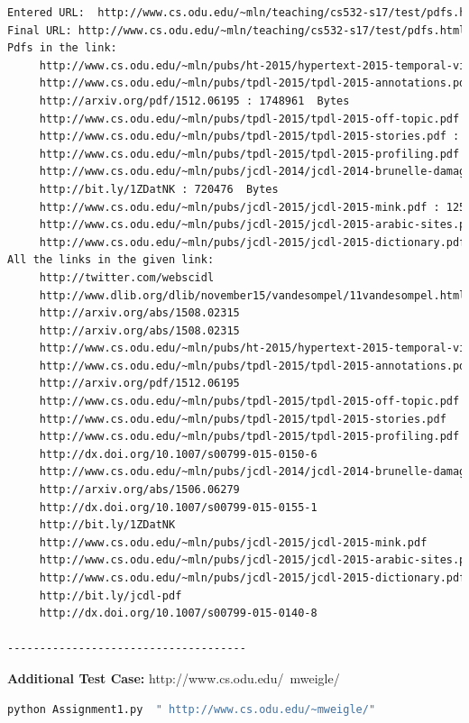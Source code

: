 \documentclass[a4paper, 11pt]{article}
\begin{document}
\begin{lstlisting}[language=bash,label=Output:,caption=Output:]
Entered URL:  http://www.cs.odu.edu/~mln/teaching/cs532-s17/test/pdfs.html
Final URL: http://www.cs.odu.edu/~mln/teaching/cs532-s17/test/pdfs.html
Pdfs in the link:
	 http://www.cs.odu.edu/~mln/pubs/ht-2015/hypertext-2015-temporal-violations.pdf : 2184076  Bytes
	 http://www.cs.odu.edu/~mln/pubs/tpdl-2015/tpdl-2015-annotations.pdf : 622981  Bytes
	 http://arxiv.org/pdf/1512.06195 : 1748961  Bytes
	 http://www.cs.odu.edu/~mln/pubs/tpdl-2015/tpdl-2015-off-topic.pdf : 4308768  Bytes
	 http://www.cs.odu.edu/~mln/pubs/tpdl-2015/tpdl-2015-stories.pdf : 1274604  Bytes
	 http://www.cs.odu.edu/~mln/pubs/tpdl-2015/tpdl-2015-profiling.pdf : 639001  Bytes
	 http://www.cs.odu.edu/~mln/pubs/jcdl-2014/jcdl-2014-brunelle-damage.pdf : 2205546  Bytes
	 http://bit.ly/1ZDatNK : 720476  Bytes
	 http://www.cs.odu.edu/~mln/pubs/jcdl-2015/jcdl-2015-mink.pdf : 1254605  Bytes
	 http://www.cs.odu.edu/~mln/pubs/jcdl-2015/jcdl-2015-arabic-sites.pdf : 709420  Bytes
	 http://www.cs.odu.edu/~mln/pubs/jcdl-2015/jcdl-2015-dictionary.pdf : 2350603  Bytes
All the links in the given link:
	 http://twitter.com/webscidl
	 http://www.dlib.org/dlib/november15/vandesompel/11vandesompel.html
	 http://arxiv.org/abs/1508.02315
	 http://arxiv.org/abs/1508.02315
	 http://www.cs.odu.edu/~mln/pubs/ht-2015/hypertext-2015-temporal-violations.pdf
	 http://www.cs.odu.edu/~mln/pubs/tpdl-2015/tpdl-2015-annotations.pdf
	 http://arxiv.org/pdf/1512.06195
	 http://www.cs.odu.edu/~mln/pubs/tpdl-2015/tpdl-2015-off-topic.pdf
	 http://www.cs.odu.edu/~mln/pubs/tpdl-2015/tpdl-2015-stories.pdf
	 http://www.cs.odu.edu/~mln/pubs/tpdl-2015/tpdl-2015-profiling.pdf
	 http://dx.doi.org/10.1007/s00799-015-0150-6
	 http://www.cs.odu.edu/~mln/pubs/jcdl-2014/jcdl-2014-brunelle-damage.pdf
	 http://arxiv.org/abs/1506.06279
	 http://dx.doi.org/10.1007/s00799-015-0155-1
	 http://bit.ly/1ZDatNK
	 http://www.cs.odu.edu/~mln/pubs/jcdl-2015/jcdl-2015-mink.pdf
	 http://www.cs.odu.edu/~mln/pubs/jcdl-2015/jcdl-2015-arabic-sites.pdf
	 http://www.cs.odu.edu/~mln/pubs/jcdl-2015/jcdl-2015-dictionary.pdf
	 http://bit.ly/jcdl-pdf
	 http://dx.doi.org/10.1007/s00799-015-0140-8

-------------------------------------
\end{lstlisting}
\noindent
\textbf{Additional Test Case:}
 http://www.cs.odu.edu/~mweigle/
\begin{lstlisting}[language=bash,label=Command:,caption=Command:]
python Assignment1.py  " http://www.cs.odu.edu/~mweigle/" 
\end{lstlisting}
\end{document}
